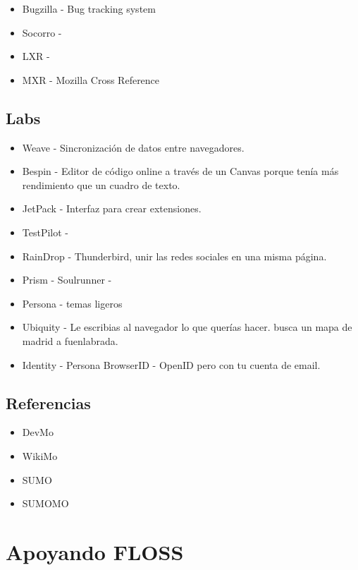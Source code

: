 \documentclass[11pt]{scrartcl}
\begin{document}
\begin{itemize}
	\item Bugzilla - Bug tracking system
	\item Socorro -
	\item LXR - 
	\item MXR - Mozilla Cross Reference
\end{itemize}


\subsection{Labs}
\label{sub:labs}

\begin{itemize}
	\item Weave - Sincronizaci\'on de datos entre navegadores.
	\item Bespin - Editor de c\'odigo online a trav\'es de un Canvas porque ten\'ia m\'as rendimiento que un cuadro de texto.
	\item JetPack - Interfaz para crear extensiones.
	\item TestPilot - 
	\item RainDrop - Thunderbird, unir las redes sociales en una misma p\'agina.
	\item Prism - Soulrunner - 
	\item Persona - temas ligeros
	\item Ubiquity - Le escribias al navegador lo que quer\'ias hacer. busca un mapa de madrid a fuenlabrada.
	\item Identity - Persona BrowserID - OpenID pero con tu cuenta de email.
\end{itemize}


\subsection{Referencias}
\label{sub:references}

\begin{itemize}
	\item DevMo
	\item WikiMo
	\item SUMO
	\item SUMOMO
\end{itemize}


\section{Apoyando FLOSS}
\label{sec:floss}
\end{document}
